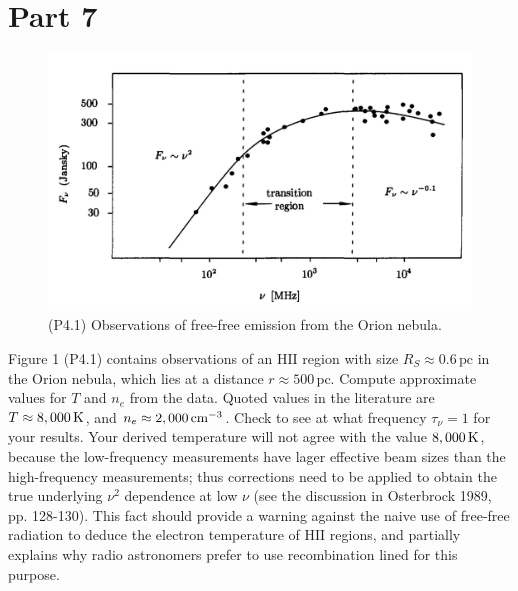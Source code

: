 \documentclass[12pt]{article}
\begin{document}

\section*{Part 7}

\begin{figure}[h] \label{fig:P4-1}
\includegraphics[width=15cm]{FigP4-1.png}
\centering
\caption{(P4.1) Observations of free-free emission from the Orion nebula.}
\end{figure}

Figure 1 (P4.1) contains observations of an $\mathrm{HII}$ region with size $R_S \approx 0.6\,\mathrm{pc}$ in the Orion nebula, which lies at a distance $r \approx 500\,\mathrm{pc}$. Compute approximate values for $T$ and $n_e$ from the data. Quoted values in the literature are $T \approx 8,000 \,{\rm K}$, and $n_e \approx 2,000\,{\rm cm}^{-3}$. Check to see at what frequency $\tau_\nu =1$ for your results. Your derived temperature will not agree with the value $8,000\, {\rm K}$, because the low-frequency measurements have lager effective beam sizes than the high-frequency measurements; thus corrections need to be applied to obtain the true underlying $\nu^2$ dependence at low $\nu$ (see the discussion in Osterbrock 1989, pp. 128-130). This fact should provide a warning against the naive use of free-free radiation to deduce the electron temperature of $\mathrm{HII}$ regions, and partially explains why radio astronomers prefer to use recombination lined for this purpose. 

\end{document}

